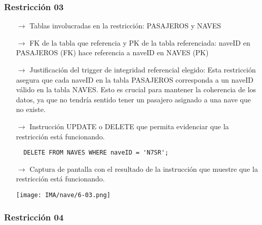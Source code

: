 \subsubsection*{Restricción 03}

\begin{itemize}
  \item[$\rightarrow$] Tablas involucradas en la restricción: PASAJEROS y NAVES
  \item[$\rightarrow$] FK de la tabla que referencia y PK de la tabla referenciada: naveID en PASAJEROS (FK) hace referencia a naveID en NAVES (PK)
  \item[$\rightarrow$] Justificación del trigger de integridad referencial elegido: Esta restricción asegura que cada naveID en la tabla PASAJEROS corresponda a un naveID válido en la tabla NAVES. Esto es crucial para mantener la coherencia de los datos, ya que no tendría sentido tener un pasajero asignado a una nave que no existe.
  \item[$\rightarrow$] Instrucción UPDATE o DELETE que permita evidenciar que la restricción está funcionando.
  \begin{verbatim}
  DELETE FROM NAVES WHERE naveID = 'N7SR';
  \end{verbatim}
  \item[$\rightarrow$] Captura de pantalla con el resultado de la instrucción que muestre que la restricción está funcionando.    
        \begin{center}
          \texttt{[image: IMA/nave/6-03.png]}
        \end{center}

\end{itemize}

\subsubsection*{Restricción 04}

